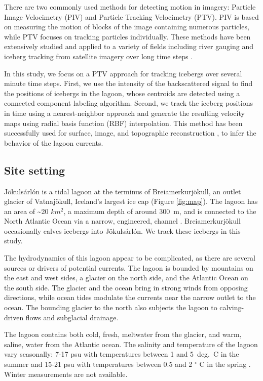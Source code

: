 There are two commonly used methods for detecting motion in imagery: Particle Image Velocimetry (PIV) and Particle Tracking Velocimetry (PTV).
PIV is based on measuring the motion of blocks of the image containing numerous particles, while PTV focuses on tracking particles individually. These methods have been extensively studied and applied to a variety of fields including river gauging \citep{creutin2003river} and iceberg tracking from satellite imagery over long time steps \citep{silva2005computer}.

In this study,  we focus on a PTV approach for tracking icebergs over several minute time steps.  First, we use the intensity of the backscattered signal to find the positions of icebergs in the lagoon, whose centroids are detected using a connected component labeling algorithm. Second, we track the iceberg positions in time using a nearest-neighbor approach and generate the resulting velocity maps using radial basis function (RBF) interpolation. This method has been successfully used for surface, image, and topographic reconstruction \citep{hardy1971multiquadric,carr1997surface,carr2001reconstruction,gumerov2007fast},  to infer the behavior of the lagoon currents.


\subsection{Site setting}
Jökulsárlón is a tidal lagoon at the terminus of Brei{\dh}amerkurjökull, an outlet glacier of Vatnajökull, Iceland's largest ice cap (Figure \ref{fig:map}). The lagoon has an area of \textasciitilde20 $km^2$, a maximum depth of around 300~m, and is connected to the North Atlantic Ocean via a narrow, engineered, channel \citep{bjornsson1996scales,bjornsson2001jokulsarlon,howat2008dynamic}. Brei{\dh}amerkurjökull occasionally calves icebergs into Jökulsárlón. We track these icebergs in this study.  

The hydrodynamics of this lagoon appear to be complicated, as there are several sources or drivers of potential currents.  The lagoon is bounded by mountains on the east and west sides, a glacier on the north side, and the Atlantic Ocean on the south side. The glacier and the ocean bring in strong winds from opposing directions, while ocean tides modulate the currents near the narrow outlet to the ocean. The bounding glacier to the north also subjects the lagoon to calving-driven flows and subglacial drainage. 

The lagoon contains both cold, fresh, meltwater from the glacier, and  warm, saline, water from the Atlantic ocean.  The salinity and temperature of the lagoon vary seasonally: 7-17 psu with temperatures between 1 and 5~deg.~C in the summer \citep{DIXONEOS} and 15-21 psu with temperatures between 0.5 and 2 $^\circ$ C in the spring \citep{brandon2013hydrographic}. Winter measurements are not available.

